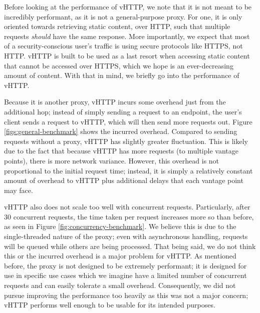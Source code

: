 Before looking at the performance of vHTTP, we note that it is not meant to be
incredibly performant, as it is not a general-purpose proxy. For one, it is
only oriented towards retrieving static content, over HTTP, such that multiple
requests \emph{should} have the same response. More importantly, we expect that
most of a security-conscious user's traffic is using secure protocols like
HTTPS, not HTTP. vHTTP is built to be used as a last resort when accessing
static content that cannot be accessed over HTTPS, which we hope is an
ever-decreasing amount of content. With that in mind, we briefly go into the
performance of vHTTP.

Because it is another proxy, vHTTP incurs some overhead just from the
additional hop; instead of simply sending a request to an endpoint, the user's
client sends a request to vHTTP, which will then send more requests out.
Figure \ref{figs:general-benchmark} shows the incurred overhead. Compared to
sending requests without a proxy, vHTTP has slightly greater fluctuation. This
is likely due to the fact that because vHTTP has more requests (to multiple
vantage points), there is more network variance. However, this overhead is not
proportional to the initial request time; instead, it is simply a relatively
constant amount of overhead to vHTTP plus additional delays that each vantage
point may face.

vHTTP also does not scale too well with concurrent requests. Particularly,
after 30 concurrent requests, the time taken per request increases more so
than before, as seen in Figure \ref{fig:concurrency-benchmark}. We believe this
is due to the single-threaded nature of the proxy; even with asynchronous
handling, requests will be queued while others are being processed. That being
said, we do not think this or the incurred overhead is a major problem for
vHTTP. As mentioned before, the proxy is not designed to be extremely
performant; it is designed for use in specific use cases which we imagine have
a limited number of concurrent requests and can easily tolerate a small
overhead. Consequently, we did not pursue improving the performance too heavily
as this was not a major concern; vHTTP performs well enough to be usable for
its intended purposes.



